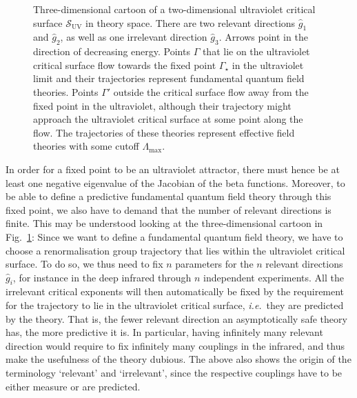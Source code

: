 \documentclass[11pt]{book}
\newcommand\ie{\textit{i.e.}\ }
\numberwithin{equation}{chapter}
\begin{document}
\begin{figure}[t]
  \begin{center}
    
  \end{center}
  \vspace*{-2mm}
  \caption{
    Three-dimensional cartoon of a two-dimensional
    ultraviolet critical surface
    $\mathcal S_{\scriptscriptstyle{\mathrm{UV}}}$
    in theory space. There are two relevant directions
    $\hat g_1$ and $\hat g_2$, as well as one irrelevant
    direction $\hat g_3$. Arrows point in the direction of
    decreasing energy.
    Points $\Gamma$ that lie on the ultraviolet critical
    surface flow towards the fixed point $\Gamma_{\!\star}$ in the
    ultraviolet limit and their trajectories represent fundamental
    quantum field theories. Points $\Gamma'$ outside the critical
    surface flow away from the fixed point in the ultraviolet, although
    their trajectory might approach the ultraviolet critical surface
    at some point along the flow.
    The trajectories of these theories represent effective field theories
    with some cutoff
    $\Lambda_{\mathrm{\scriptscriptstyle{max}}}$.
  }
  \label{fig:uvsurface}
\end{figure}
In order for a fixed point to be an ultraviolet attractor,
there must hence be at least one negative eigenvalue
of the Jacobian of the beta functions. Moreover,
to be able to define a predictive fundamental
quantum field theory through this fixed point,
we also have to demand that the number of relevant
directions is finite. This may be understood looking
at the three-dimensional cartoon in Fig.~\ref{fig:uvsurface}:
Since we want to define a fundamental quantum field
theory, we have to choose a renormalisation group trajectory
that lies within the ultraviolet critical surface.
To do so, we thus need to fix $n$ parameters for the $n$
relevant directions $\hat g_i$, for instance in the deep infrared
through $n$ independent experiments. All the irrelevant
critical exponents will then automatically be fixed by the requirement
for the trajectory to lie in the ultraviolet critical surface,
\ie they are predicted by the theory.
That is, the fewer relevant direction an asymptotically safe theory
has, the more predictive it is. In particular, having
infinitely many relevant direction would require
to fix infinitely many couplings in the infrared, and thus
make the usefulness of the theory dubious.
The above also shows the origin of the terminology `relevant' and `irrelevant',
since the respective couplings have to be either measure or are predicted.
\end{document}
